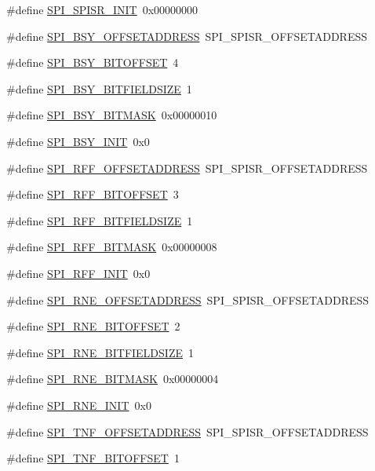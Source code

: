 \begin{DoxyCompactItemize}
\#define \hyperlink{a00573_ac61b96b3b08a4cd275553b624848060c}{SPI\_\-SPISR\_\-INIT}~0x00000000
\item 
\#define \hyperlink{a00573_a95a47cdeb59f8a7d9ea5c87499f13acb}{SPI\_\-BSY\_\-OFFSETADDRESS}~SPI\_\-SPISR\_\-OFFSETADDRESS
\item 
\#define \hyperlink{a00573_a935c4a34137e3d94f86974e68481909f}{SPI\_\-BSY\_\-BITOFFSET}~4
\item 
\#define \hyperlink{a00573_ad53cc4c58458552bdbafa8c42fa265bd}{SPI\_\-BSY\_\-BITFIELDSIZE}~1
\item 
\#define \hyperlink{a00573_af3a7d37206af7bfa6e2188971e59d6e1}{SPI\_\-BSY\_\-BITMASK}~0x00000010
\item 
\#define \hyperlink{a00573_aedf5172adf0f64b6ac2e60377a5f1802}{SPI\_\-BSY\_\-INIT}~0x0
\item 
\#define \hyperlink{a00573_abe9d2f5dbfce9ab6a16ead77b76fbece}{SPI\_\-RFF\_\-OFFSETADDRESS}~SPI\_\-SPISR\_\-OFFSETADDRESS
\item 
\#define \hyperlink{a00573_a4a6e5829b0d6a2f2afa1a9696fe99fd3}{SPI\_\-RFF\_\-BITOFFSET}~3
\item 
\#define \hyperlink{a00573_a29d2697bd6417ad237880dc5e66804b1}{SPI\_\-RFF\_\-BITFIELDSIZE}~1
\item 
\#define \hyperlink{a00573_a4c19120c481d2ba121c0fcb48ae6ea12}{SPI\_\-RFF\_\-BITMASK}~0x00000008
\item 
\#define \hyperlink{a00573_acaa7e7382ebe717b20ab3ebdc79343ef}{SPI\_\-RFF\_\-INIT}~0x0
\item 
\#define \hyperlink{a00573_a45efe987414d6417e82243e0c63feb0b}{SPI\_\-RNE\_\-OFFSETADDRESS}~SPI\_\-SPISR\_\-OFFSETADDRESS
\item 
\#define \hyperlink{a00573_a1cac7c2f55c444b806069f776d3bf15d}{SPI\_\-RNE\_\-BITOFFSET}~2
\item 
\#define \hyperlink{a00573_a1359c99978c037bc2f8f1a668f90e6b5}{SPI\_\-RNE\_\-BITFIELDSIZE}~1
\item 
\#define \hyperlink{a00573_afc54cf4ee84eff7fe7b6e3e65a8327f0}{SPI\_\-RNE\_\-BITMASK}~0x00000004
\item 
\#define \hyperlink{a00573_a4dc029405f808d6d4d752205920ca307}{SPI\_\-RNE\_\-INIT}~0x0
\item 
\#define \hyperlink{a00573_a280896b40e0248f0f8d83c6480ec81c0}{SPI\_\-TNF\_\-OFFSETADDRESS}~SPI\_\-SPISR\_\-OFFSETADDRESS
\item 
\#define \hyperlink{a00573_a17fcb52295bb50d1dd15a402412f6ab6}{SPI\_\-TNF\_\-BITOFFSET}~1
\item 

\end{DoxyCompactItemize}
